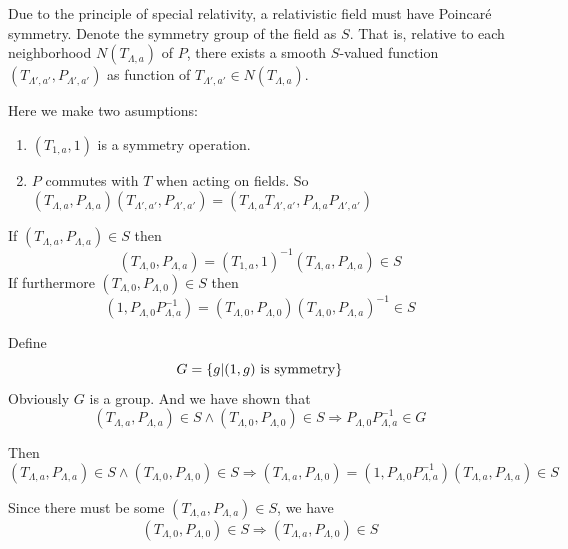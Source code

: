 \documentclass[12pt]{book}
\begin{document}
	Due to the principle of special relativity, a relativistic field must have Poincar\'e symmetry. Denote the symmetry group of the field as $S$. That is, relative to each neighborhood $N(T_{\Lambda,a})$ of $P$, there exists a smooth $S$-valued function $(T_{\Lambda',a'},P_{\Lambda',a'})$ as function of $T_{\Lambda',a'}\in N(T_{\Lambda,a})$.
	
	Here we make two asumptions:
	\begin{enumerate}
		\item $(T_{1,a},1)$ is a symmetry operation.
		\item $P$ commutes with $T$ when acting on fields. So $(T_{\Lambda,a},P_{\Lambda,a})(T_{\Lambda',a'},P_{\Lambda',a'})=(T_{\Lambda,a}T_{\Lambda',a'},P_{\Lambda,a}P_{\Lambda',a'})$
	\end{enumerate}
	
	If $(T_{\Lambda,a},P_{\Lambda,a})\in S$ then 
	\begin{equation}
		(T_{\Lambda,0},P_{\Lambda,a})=(T_{1,a},1)^{-1}(T_{\Lambda,a},P_{\Lambda,a}) \in S
	\end{equation}
	If furthermore $(T_{\Lambda,0},P_{\Lambda,0})\in S$ then  
	\begin{equation}
		(1,P_{\Lambda,0}P_{\Lambda,a}^{-1})=(T_{\Lambda,0},P_{\Lambda,0})(T_{\Lambda,0},P_{\Lambda,a})^{-1}\in S
	\end{equation}
	
	Define 
	\begin{equation}
		G=\{g|(1,g) {\rm \ is \ symmetry}\}
	\end{equation}
	Obviously $G$ is a group. And we have shown that 
	\begin{equation}
		(T_{\Lambda,a},P_{\Lambda,a})\in S\wedge(T_{\Lambda,0},P_{\Lambda,0})\in S \Rightarrow P_{\Lambda,0}P_{\Lambda,a}^{-1}\in G
	\end{equation}
	
	Then  
	\begin{equation}
		(T_{\Lambda,a},P_{\Lambda,a})\in S\wedge(T_{\Lambda,0},P_{\Lambda,0})\in S \Rightarrow(T_{\Lambda,a},P_{\Lambda,0})=(1,P_{\Lambda,0}P_{\Lambda,a}^{-1})(T_{\Lambda,a},P_{\Lambda,a})\in S
	\end{equation}
	
	Since there must be some $(T_{\Lambda,a},P_{\Lambda,a})\in S$, we have
	\begin{equation}
		(T_{\Lambda,0},P_{\Lambda,0})\in S \Rightarrow(T_{\Lambda,a},P_{\Lambda,0})\in S
	\end{equation}
	
\end{document}
